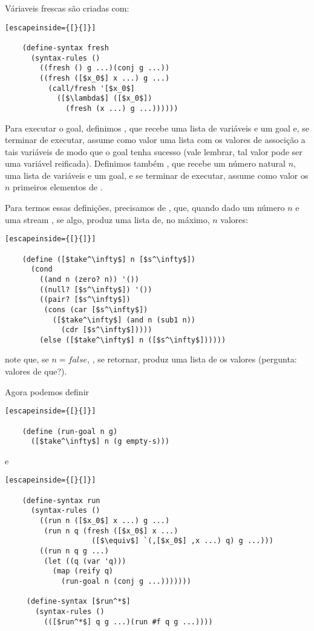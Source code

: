 \documentclass{article}
\begin{document}
  Váriaveis frescas são criadas com:

  \begin{lstlisting}[escapeinside={[}{]}]

    (define-syntax fresh
      (syntax-rules ()
        ((fresh () g ...)(conj g ...))
        ((fresh ([$x_0$] x ...) g ...)
          (call/fresh '[$x_0$]
            ([$\lambda$] ([$x_0$])
              (fresh (x ...) g ...))))))

  \end{lstlisting}
  
  Para executar o goal, definimos , que recebe uma
  lista de variáveis e um goal e, se terminar de executar, assume como
  valor uma lista com os valores de associção a tais variáveis de modo
  que o goal tenha sucesso (vale lembrar, tal valor pode ser uma
  variável reificada). Definimos também , que recebe
  um número natural $n$, uma lista de variáveis e um goal, e se
  terminar de executar, assume como valor os $n$ primeiros elementos
  de .

  Para termos essas definições, precisamos de ,
  que, quando dado um número $n$ e uma stream , se
  algo, produz uma lista de, no máximo, $n$ valores:

  \begin{lstlisting}[escapeinside={[}{]}]

    (define ([$take^\infty$] n [$s^\infty$])
      (cond
        ((and n (zero? n)) '())
        ((null? [$s^\infty$]) '())
        ((pair? [$s^\infty$])
         (cons (car [$s^\infty$])
           ([$take^\infty$] (and n (sub1 n))
             (cdr [$s^\infty$]))))
        (else ([$take^\infty$] n ([$s^\infty$])))))

  \end{lstlisting}

  \noindent note que, se $n = false$, , se
  retornar, produz uma lista de  os valores (pergunta:
  valores de que?).

  Agora podemos definir

  \begin{lstlisting}[escapeinside={[}{]}]

    (define (run-goal n g)
      ([$take^\infty$] n (g empty-s)))

  \end{lstlisting}

  \noindent e

  \begin{lstlisting}[escapeinside={[}{]}]

    (define-syntax run
      (syntax-rules ()
        ((run n ([$x_0$] x ...) g ...)
         (run n q (fresh ([$x_0$] x ...)
                    ([$\equiv$] `(,[$x_0$] ,x ...) q) g ...)))
        ((run n q g ...)
         (let ((q (var 'q)))
           (map (reify q)
             (run-goal n (conj g ...)))))))

     (define-syntax [$run^*$]
       (syntax-rules ()
         (([$run^*$] q g ...)(run #f q g ...))))

  \end{lstlisting}
\end{document}
